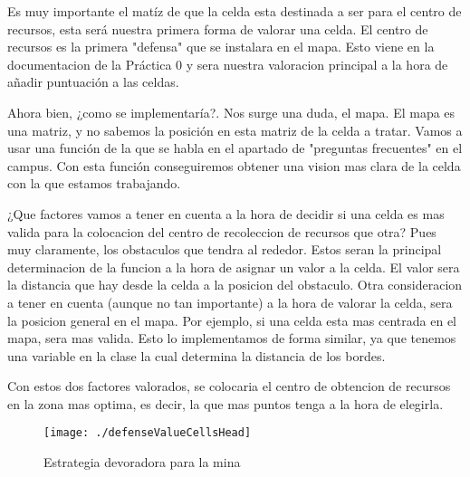     Es muy importante el matíz de que la celda esta destinada a ser para el centro de recursos, esta será nuestra primera forma de valorar
una celda. El centro de recursos es la primera "defensa" que se instalara en el mapa. Esto viene en la documentacion de la Práctica 0 y sera nuestra valoracion principal a la hora de añadir puntuación
a las celdas. 

    Ahora bien, ¿como se implementaría?. Nos surge una duda, el mapa. El mapa es una matriz, y no sabemos la posición en esta matriz de la celda
a tratar. Vamos a usar una función de la que se habla en el apartado de "preguntas frecuentes" en el campus. Con esta función conseguiremos
obtener una vision mas clara de la celda con la que estamos trabajando.

    ¿Que factores vamos a tener en cuenta a la hora de decidir si una celda es mas valida para la colocacion del centro de recoleccion 
de recursos que otra? Pues muy claramente, los obstaculos que tendra al rededor. Estos seran la principal determinacion de la funcion
a la hora de asignar un valor a la celda. El valor sera la distancia que hay desde la celda a la posicion del obstaculo. Otra consideracion
a tener en cuenta (aunque no tan importante) a la hora de valorar la celda, sera la posicion general en el mapa. Por ejemplo, si una celda
esta mas centrada en el mapa, sera mas valida. Esto lo implementamos de forma similar, ya que tenemos una variable en la clase la cual
determina la distancia de los bordes. 

    Con estos dos factores valorados, se colocaria el centro de obtencion de recursos en la zona mas optima, es decir, la que mas puntos
tenga a la hora de elegirla.

\begin{figure}
\centering
\texttt{[image: ./defenseValueCellsHead]} %
\caption{Estrategia devoradora para la mina}
\label{fig:defenseValueCellsHead}
\end{figure}